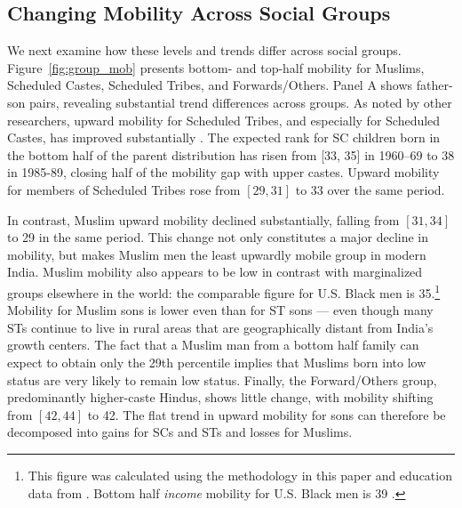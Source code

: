 \documentclass[12pt,letterpaper]{article}
\numberwithin{equation}{section}
\begin{document}
\subsection{Changing Mobility Across Social Groups}
\label{sec:groups}

We next examine how these levels and trends differ across social groups.  Figure~\ref{fig:group_mob} presents bottom- and top-half mobility for Muslims, Scheduled Castes, Scheduled Tribes, and Forwards/Others. Panel A shows father-son pairs, revealing substantial trend differences across groups. As noted by other researchers, upward mobility for Scheduled Tribes, and especially for Scheduled Castes, has improved substantially \cite{hnatkovska2012,emran2015}. The expected rank for SC children born in the bottom half of the parent distribution has risen from [33, 35] in 1960--69 to 38 in 1985-89, closing half of the mobility gap with upper castes. Upward mobility for members of Scheduled Tribes rose from $[29,31]$ to 33 over the same period.

In contrast, Muslim upward mobility declined substantially, falling from $[31, 34]$ to 29 in the same period. This change not only constitutes a major decline in mobility, but makes Muslim men the least upwardly mobile group in modern India. Muslim mobility also appears to be low in contrast with marginalized groups elsewhere in the world: the comparable figure for U.S. Black men is 35.\footnote{This figure was calculated using the methodology in this paper and education data from . Bottom half \textit{income} mobility for U.S. Black men is 39 \cite{chetty2018}.} Mobility for Muslim sons is lower even than for ST sons --- even though many STs continue to live in rural areas that are geographically distant from India's growth centers.   The fact that a Muslim man from a bottom half family can expect to obtain only the 29th percentile implies that Muslims born into low status are very likely to remain low status. Finally, the Forward/Others group, predominantly higher-caste Hindus, shows little change, with mobility shifting from $[42,44]$ to 42. The flat trend in upward mobility for sons can therefore be decomposed into gains for SCs and STs and losses for Muslims.
\end{document}
